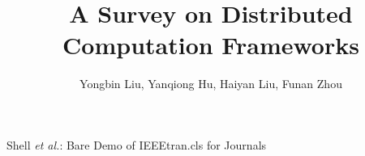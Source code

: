\documentclass[journal]{IEEEtran}
\begin{document}
%
\title{A Survey on Distributed Computation Frameworks}
%
%
%

\author{Yongbin Liu, Yanqiong Hu, Haiyan Liu, Funan Zhou}

% 
%



%
{Shell \MakeLowercase{\textit{et al.}}: Bare Demo of IEEEtran.cls for Journals}
% 




\end{document}
